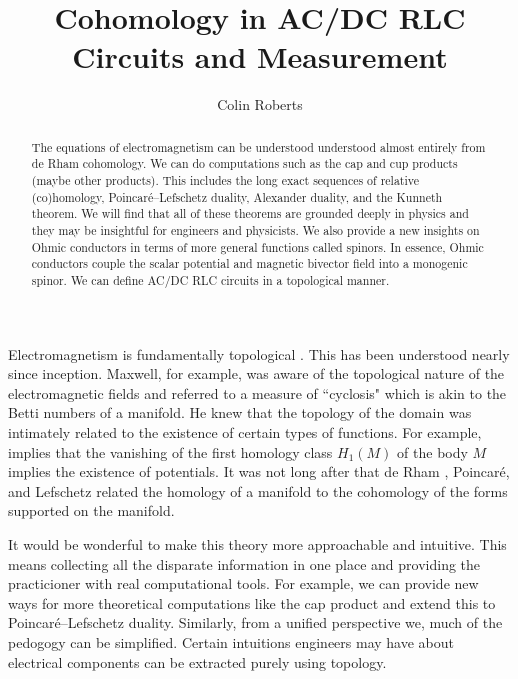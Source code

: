 \documentclass{article}
\title{Cohomology in AC/DC RLC Circuits and Measurement}
\author{Colin Roberts}
\affil{autoparallel.xyz}
\begin{document}
\maketitle
\begin{abstract}
The equations of electromagnetism can be understood understood almost entirely from de Rham cohomology. 
We can do computations such as the cap and cup products (maybe other products). 
This includes the long exact sequences of relative (co)homology, Poincar\'e--Lefschetz duality, Alexander duality, and the Kunneth theorem. 
We will find that all of these theorems are grounded deeply in physics and they may be insightful for engineers and physicists. 
We also provide a new insights on Ohmic conductors in terms of more general functions called spinors. 
In essence, Ohmic conductors couple the scalar potential and magnetic bivector field into a monogenic spinor.
We can define AC/DC RLC circuits in a topological manner.
\end{abstract}


\newpage

Electromagnetism is fundamentally topological \cite{gross_electromagnetic_2004}. 
This has been understood nearly since inception. 
Maxwell, for example, was aware of the topological nature of the electromagnetic fields and referred to a measure of ``cyclosis" which is akin to the Betti numbers of a manifold. 
He knew that the topology of the domain was intimately related to the existence of certain types of functions.
 For example, \cite[theorem 1]{maxwell_treatise_1873} implies that the vanishing of the first homology class $H_1(M)$ of the body $M$ implies the existence of potentials. 
 It was not long after that de Rham , Poincar\'e, and Lefschetz related the homology of a manifold to the cohomology of the forms supported on the manifold.

It would be wonderful to make this theory more approachable and intuitive. 
This means collecting all the disparate information in one place and providing the practicioner with real computational tools. 
For example, we can provide new ways for more theoretical computations like the cap product and extend this to Poincar\'e--Lefschetz duality. 
Similarly, from a unified perspective we, much of the pedogogy can be simplified. 
Certain intuitions engineers may have about electrical components can be extracted purely using topology.
\end{document}
